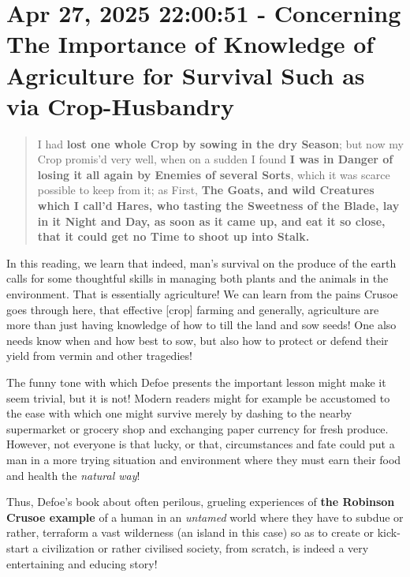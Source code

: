 \documentclass[a4paper]{article}
\begin{document}
\section{Apr 27, 2025 22:00:51 - Concerning The Importance of Knowledge of Agriculture for Survival Such as via Crop-Husbandry}
\label{SEC20}



\noindent
\begin{minipage}{1\textwidth}
\vspace{1em}
\begin{quotation}
{\ttfamily


I had \textbf{lost one whole Crop by sowing in the dry Season}; but now my Crop promis’d very well, when on a sudden I found \textbf{I was in Danger of losing it all again by Enemies of several Sorts}, which it was scarce possible to keep from it; as First, \textbf{The Goats, and wild Creatures which I call’d Hares, who tasting the Sweetness of the Blade, lay in it Night and Day, as soon as it came up, and eat it so close, that it could get no Time to shoot up into Stalk.}


}
\end{quotation}
\vspace{1em}
\end{minipage}


In this reading, we learn that indeed, man's survival on the produce of the earth calls for some thoughtful skills in managing both plants and the animals in the environment. That is essentially agriculture!  We can learn from the pains Crusoe goes through here, that effective [crop] farming and generally, agriculture are more than just having knowledge of how to till the land and sow seeds! One also needs know when and how best to sow, but also how to protect or defend their yield from vermin and other tragedies!

The funny tone with which Defoe presents the important lesson might make it seem trivial, but it is not! Modern readers might for example be accustomed to the ease with which one might survive merely by dashing to the nearby supermarket or grocery shop and exchanging paper currency for fresh produce. However, not everyone is that lucky, or that, circumstances and fate could put a man in a more trying situation and environment where they must earn their food and health the \textit{natural way}!


Thus, Defoe's book about often perilous, grueling experiences of \textbf{the Robinson Crusoe example} of a human in an \textit{untamed} world where they have to subdue or rather, terraform a vast wilderness (an island in this case) so as to create or kick-start a civilization or rather civilised society, from scratch, is indeed a very entertaining and educing story! 
\end{document}
